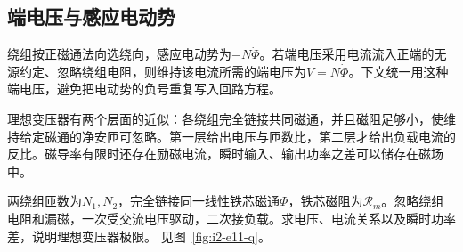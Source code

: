\subsection{端电压与感应电动势}
绕组按正磁通法向选绕向，感应电动势为$-N\dot\Phi$。若端电压采用电流流入正端的无源约定、忽略绕组电阻，则维持该电流所需的端电压为$V=N\dot\Phi$。下文统一用这种端电压，避免把电动势的负号重复写入回路方程。

理想变压器有两个层面的近似：各绕组完全链接共同磁通，并且磁阻足够小，使维持给定磁通的净安匝可忽略。第一层给出电压与匝数比，第二层才给出负载电流的反比。磁导率有限时还存在励磁电流，瞬时输入、输出功率之差可以储存在磁场中。


\begin{example}[有限磁导率变压器的功率]\label{ex:i2-e11}
两绕组匝数为$N_1,N_2$，完全链接同一线性铁芯磁通$\Phi$，铁芯磁阻为$\mathcal R_m$。忽略绕组电阻和漏磁，一次受交流电压驱动，二次接负载。求电压、电流关系以及瞬时功率差，说明理想变压器极限。 见图~\ref{fig:i2-e11-q}。
\end{example}


